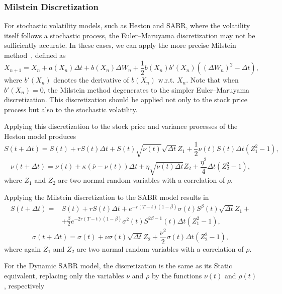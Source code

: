 \subsubsection{Milstein Discretization}
For stochastic volatility models, such as Heston and SABR, where the volatility itself follows a stochastic process, the Euler–Maruyama discretization may not be sufficiently accurate. In these cases, we can apply the more precise Milstein method~\citep{Milstein}, defined as
\begin{equation}
X_{n+1}=X_n+a(X_n)\Delta t+b(X_n)\Delta W_n+\frac{1}{2}b(X_n)b'(X_n)((\Delta W_n)^2-\Delta t),
\end{equation}
\noindent where $b'(X_n)$ denotes the derivative of $b(X_n)$ w.r.t. $X_n$. Note that when $b'(X_n)=0$, the Milstein method degenerates to the simpler Euler–Maruyama discretization. This discretization should be applied not only to the stock price process but also to the stochastic volatility.

Applying this discretization to the stock price and variance processes of the Heston model produces
\begin{equation}
S(t+\Delta t)=S(t)+rS(t)\Delta t+S(t)\sqrt{\nu(t)}\sqrt{\Delta t}Z_1+\frac{1}{2}\nu(t)S(t)\Delta t(Z_1^2-1),
\end{equation}
\begin{equation}
\nu(t+\Delta t)=\nu(t)+\kappa(\overline{\nu}-\nu(t))\Delta t+\eta\sqrt{\nu(t)\Delta t}Z_2+\frac{\eta^2}{4}\Delta t(Z_2^2-1),
\end{equation}
\noindent where $Z_1$ and $Z_2$ are two normal random variables with a correlation of $\rho$.


Applying the Milstein discretization to the SABR model results in
\begin{equation}
\begin{split}
S(t+\Delta t)=&S(t)+rS(t)\Delta t+e^{-r(T-t)(1-\beta)}\sigma(t)S^\beta(t)\sqrt{\Delta t}Z_1+\\
&+\frac{\beta}{2}e^{-2r(T-t)(1-\beta)}\sigma^2(t)S^{2\beta-1}(t)\Delta t(Z_1^2-1),
\end{split}
\end{equation}
\begin{equation}
\sigma(t+\Delta t)=\sigma(t)+\nu\sigma(t)\sqrt{\Delta t}Z_2+\frac{\nu^2}{2}\sigma(t)\Delta t(Z_2^2-1),
\end{equation}
\noindent where again $Z_1$ and $Z_2$ are two normal random variables with a correlation of $\rho$.

For the Dynamic SABR model, the discretization is the same as its Static equivalent, replacing only the variables $\nu$ and $\rho$ by the functions $\nu(t)$ and $\rho(t)$, respectively


